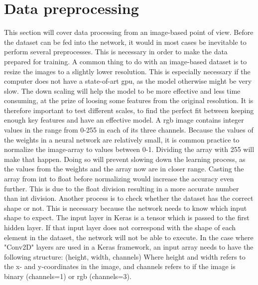 \documentclass[USenglish]{ifimaster}  %
\begin{document}
\section{Data preprocessing}
This section will cover data processing from an image-based point of view. Before the dataset can be fed into the network, it would in most cases be inevitable to perform several preprocesses. This is necessary in order to make the data prepared for training. 
\newline
A common thing to do with an image-based dataset is to resize the images to a slightly lower resolution. This is especially necessary if the computer does not have a state-of-art \ac{gpu}, as the model otherwise might be very slow. The down scaling will help the model to be more effective and less time consuming, at the prize of loosing some features from the original resolution. It is therefore important to test different scales, to find the perfect fit between keeping enough key features and have an effective model.
\newline
A \ac{rgb} image contains integer values in the range from 0-255 in each of its three channels. Because the values of the weights in a neural network are relatively small, it is common practice to normalize the image-array to values between 0-1. Dividing the array with 255 will make that happen. Doing so will prevent slowing down the learning process, as the values from the weights and the array now are in closer range. Casting the array from int to float before normalizing would increase the accuracy even further. This is due to the float division resulting in a more accurate number than int division.
\newline
\newline
Another process is to check whether the dataset has the correct shape or not. This is necessary because the network needs to know which input shape to expect. The input layer in Keras is a tensor which is passed to the first hidden layer. If that input layer does not correspond with the shape of each element in the dataset, the network will not be able to execute. In the case where "Conv2D" layers are used in a Keras framework, an input array needs to have the following structure:
\newline
\newline
(height, width, channels)
\newline
\newline
Where height and width refers to the x- and y-coordinates in the image, and channels refers to if the image is binary (channels=1) or \ac{rgb} (channels=3).
\end{document}

